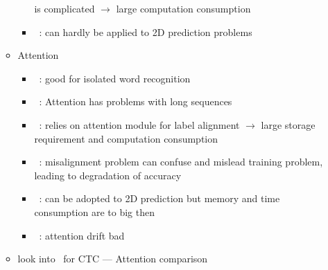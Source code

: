 \begin{itemize}
\begin{itemize}
\begin{itemize}
                        is complicated $\rightarrow$ large computation consumption
                    \item~\cite{xie_aggregation_2019}: can hardly be applied to 2D prediction
                        problems
                \end{itemize}
            \item Attention
                \begin{itemize}
                    \item~\cite{chen_text_2021}: good for isolated word recognition
                    \item~\cite{chen_text_2021}: Attention has problems with long sequences
                    \item~\cite{xie_aggregation_2019}: relies on attention module for label alignment
                        $\rightarrow$ large storage requirement and computation consumption
                    \item~\cite{xie_aggregation_2019}: misalignment problem can confuse and mislead
                        training problem, leading to degradation of accuracy
                    \item~\cite{xie_aggregation_2019}: can be adopted to 2D prediction but
                        memory and time consumption are to big then
                    \item~\cite{cheng_focusing_2017}: attention drift bad
                \end{itemize}
            \item look into~\cite{cong_comparative_2019} for CTC --- Attention comparison
        \end{itemize}
\end{itemize}


